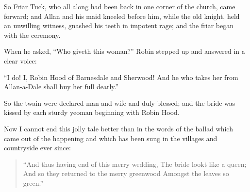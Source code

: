 So Friar Tuck, who all along had been back in one corner of the church,
came forward; and Allan and his maid kneeled before him, while the old
knight, held an unwilling witness, gnashed his teeth in impotent rage;
and the friar began with the ceremony.

When he asked, ``Who giveth this woman?'' Robin stepped up and answered
in a clear voice:

``I do! I, Robin Hood of Barnesdale and Sherwood! And he who takes her
from Allan-a-Dale shall buy her full dearly.''

So the twain were declared man and wife and duly blessed; and the bride
was kissed by each sturdy yeoman beginning with Robin Hood.

Now I cannot end this jolly tale better than in the words of the ballad
which came out of the happening and which has been sung in the villages
and countryside ever since:

\begin{quote}
“And thus having end of this merry wedding,
The bride lookt like a queen;
And so they returned to the merry greenwood
Amongst the leaves so green.”
\end{quote}
